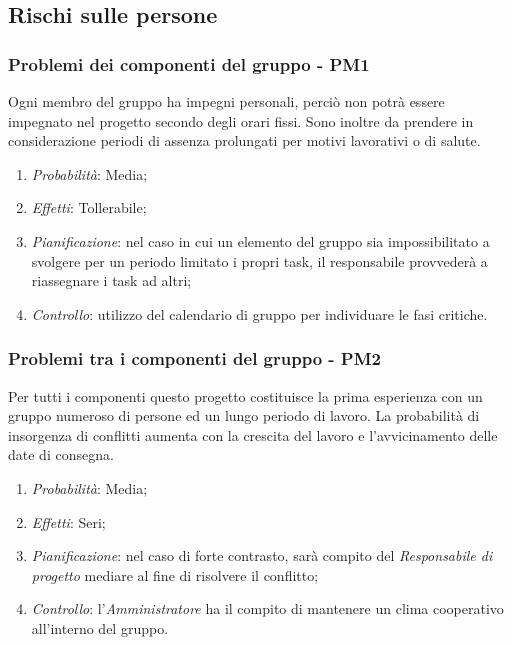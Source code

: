 \subsection{Rischi sulle persone}
\subsubsection{Problemi dei componenti del gruppo - PM1}
Ogni membro del gruppo ha impegni personali, perci\`o non potr\`a essere impegnato nel progetto secondo degli orari fissi. Sono inoltre da prendere in considerazione periodi di assenza prolungati per motivi lavorativi o di salute.
\begin{enumerate}
\item \textit{Probabilit\`a}: Media;
\item \textit{Effetti}: Tollerabile;
\item \textit{Pianificazione}: nel caso in cui un elemento del gruppo sia impossibilitato a svolgere per un periodo limitato i propri task, il responsabile provveder\`a a riassegnare i task ad altri;
\item \textit{Controllo}: utilizzo del calendario di gruppo per individuare le fasi critiche.
\end{enumerate}

\subsubsection{Problemi tra i componenti del gruppo - PM2}
Per tutti i componenti questo progetto costituisce la prima esperienza con un gruppo numeroso di persone ed un lungo periodo di lavoro. La probabilit\`a di insorgenza di conflitti aumenta con la crescita del lavoro e l'avvicinamento delle date di consegna.
\begin{enumerate}
\item \textit{Probabilit\`a}: Media;
\item \textit{Effetti}: Seri;
\item \textit{Pianificazione}: nel caso di forte contrasto, sar\`a compito del \textit{Responsabile di progetto} mediare al fine di risolvere il conflitto;
\item \textit{Controllo}: l'\textit{Amministratore} ha il compito di mantenere un clima cooperativo all'interno del gruppo.
\end{enumerate} 

